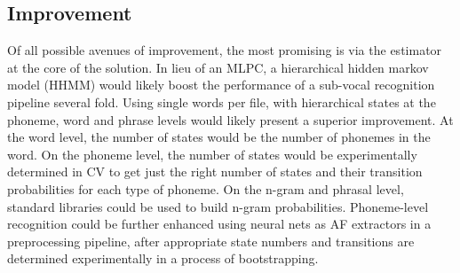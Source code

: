 \documentclass[conference]{IEEEtran}
\begin{document}

\subsection{Improvement}
Of all possible avenues of improvement, the most promising is via the estimator at the core of the solution. In lieu of an MLPC, a hierarchical hidden markov model (HHMM) would likely boost the performance of a sub-vocal recognition pipeline several fold. Using single words per file, with hierarchical states at the phoneme, word and phrase levels would likely present a superior improvement. At the word level, the number of states would be the number of phonemes in the word. On the phoneme level, the number of states would be experimentally determined in CV to get just the right number of states and their transition probabilities for each type of phoneme. On the n-gram and phrasal level, standard libraries could be used to build n-gram probabilities. Phoneme-level recognition could be further enhanced using neural nets as AF extractors in a preprocessing pipeline, after appropriate state numbers and transitions are determined experimentally in a process of bootstrapping.
\end{document}
